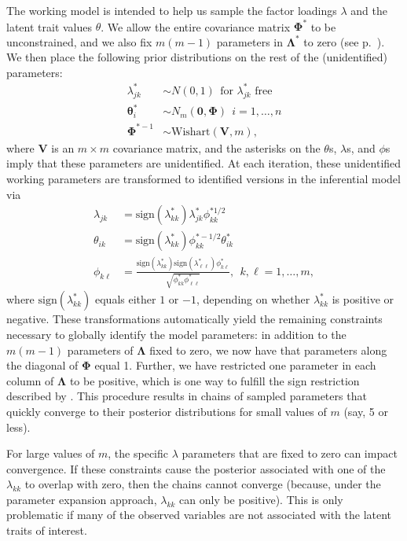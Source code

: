 The working model is intended to help us sample the factor loadings $\lambda$ and the latent trait values $\theta$.  We allow the entire covariance matrix $\bm{\Phi}^*$ to be unconstrained, and we also fix $m(m-1)$ parameters in $\bm{\Lambda}^*$ to zero (see p.~\pageref{sec:id2}).  We then place the following prior distributions on the rest of the (unidentified) parameters:
\begin{align}  \label{eq:lampri}
    \lambda_{jk}^* &\sim N(0,1)\ \ \text{for }\lambda_{jk}^*\text{ free} \\
    \bm{\theta}_{i}^* &\sim N_m(\bm{0},\bm{\Phi})\ \ i=1,\ldots,n \\ \label{eq:phipri}
    \bm{\Phi}^{*-1} &\sim \text{Wishart}(\bm{V}, m),
\end{align}
where $\bm{V}$ is an $m \times m$ covariance matrix, and the asterisks on the $\theta$s, $\lambda$s, and $\phi$s imply that these parameters are unidentified.  At each iteration, these unidentified working parameters are transformed to identified versions in the inferential model via
\begin{align}
    \lambda_{jk} &= \text{sign}(\lambda_{kk}^*) \lambda_{jk}^* \phi^{*1/2}_{kk} \\
    \theta_{ik} &= \text{sign}(\lambda_{kk}^*) \phi^{*-1/2}_{kk} \theta^*_{ik} \\
    \phi_{k\ell} &= \frac{\text{sign}(\lambda_{kk}^*) \text{sign}(\lambda_{\ell\ell}^*) \phi^*_{k\ell}}{\sqrt{\phi^{*}_{kk} \phi^{*}_{\ell\ell}}},\ \ k,\ell=1,\ldots,m,
\end{align}
where $\text{sign}(\lambda_{kk}^*)$ equals either $1$ or $-1$, depending on whether $\lambda_{kk}^*$ is positive or negative. These transformations automatically yield the remaining constraints necessary to globally identify the model parameters: in addition to the $m(m-1)$ parameters of $\bm{\Lambda}$ fixed to zero, we now have that parameters along the diagonal of $\bm{\Phi}$ equal 1.  Further, we have restricted one parameter in each column of $\bm{\Lambda}$ to be positive, which is one way to fulfill the sign restriction described by .  This procedure results in chains of sampled parameters that quickly converge to their posterior distributions for small values of $m$ (say, 5 or less).

For large values of $m$, the specific $\lambda$ parameters that are fixed to zero can impact convergence.  If these constraints cause the posterior associated with one of the $\lambda_{kk}$ to overlap with zero, then the chains cannot converge (because, under the parameter expansion approach, $\lambda_{kk}$ can only be positive).  This is only problematic if many of the observed variables are not associated with the latent traits of interest. 

